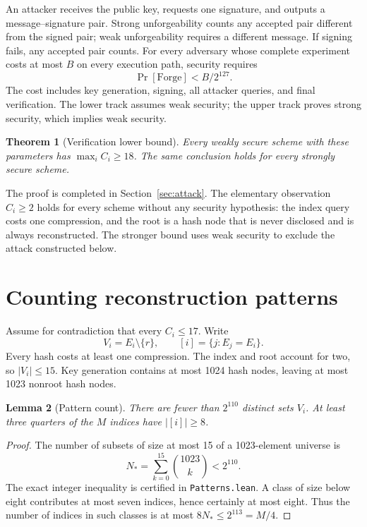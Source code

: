 \documentclass[10pt]{article}
\newtheorem{theorem}{Theorem}
\newtheorem{lemma}[theorem]{Lemma}
\begin{document}
An attacker receives the public key, requests one signature, and outputs a message--signature pair. Strong unforgeability counts any accepted pair different from the signed pair; weak unforgeability requires a different message. If signing fails, any accepted pair counts. For every adversary whose complete experiment costs at most $B$ on every execution path, security requires
\begin{equation}\label{eq:security}
\Pr[\mathrm{Forge}]<B/2^{127}.
\end{equation}
The cost includes key generation, signing, all attacker queries, and final verification. The lower track assumes weak security; the upper track proves strong security, which implies weak security.

\begin{theorem}[Verification lower bound]\label{thm:main}
Every weakly secure scheme with these parameters has $\max_i C_i\ge18$. The same conclusion holds for every strongly secure scheme.
\end{theorem}

The proof is completed in Section~\ref{sec:attack}. The elementary observation $C_i\ge2$ holds for every scheme without any security hypothesis: the index query costs one compression, and the root is a hash node that is never disclosed and is always reconstructed. The stronger bound uses weak security to exclude the attack constructed below.

\section{Counting reconstruction patterns}\label{sec:patterns}

Assume for contradiction that every $C_i\le17$. Write
\[
V_i=E_i\setminus\{r\},\qquad
[i]=\{j:E_j=E_i\}.
\]
Every hash costs at least one compression. The index and root account for two, so $|V_i|\le15$. Key generation contains at most 1024 hash nodes, leaving at most 1023 nonroot hash nodes.

\begin{lemma}[Pattern count]\label{lem:patterns}
There are fewer than $2^{110}$ distinct sets $V_i$. At least three quarters of the $M$ indices have $|[i]|\ge8$.
\end{lemma}
\begin{proof}
The number of subsets of size at most 15 of a 1023-element universe is
\begin{equation}\label{eq:pattern-count}
N_* = \sum_{k=0}^{15}\binom{1023}{k}<2^{110}.
\end{equation}
The exact integer inequality is certified in \texttt{Patterns.lean}. A class of size below eight contributes at most seven indices, hence certainly at most eight. Thus the number of indices in such classes is at most $8N_*\le2^{113}=M/4$.
\end{proof}
\end{document}

